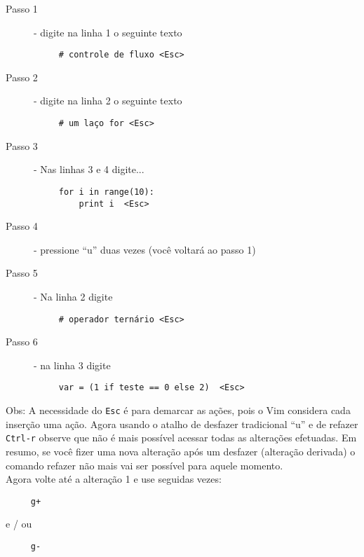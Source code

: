 \begin{description}
\item [Passo 1] - digite na linha 1 o seguinte texto
\begin{verbatim}
     # controle de fluxo <Esc>
\end{verbatim}

\item [Passo 2] - digite na linha 2 o seguinte texto
\begin{verbatim}
     # um laço for <Esc>
\end{verbatim}

\item [Passo 3] - Nas linhas 3 e 4 digite...

\begin{verbatim}
     for i in range(10):
         print i  <Esc>
\end{verbatim}

\item [Passo 4] - pressione ``u'' duas vezes (você voltará ao passo 1)
\item [Passo 5] - Na linha 2 digite

\begin{verbatim}
     # operador ternário <Esc>
\end{verbatim}

\item [Passo 6] - na linha 3 digite

\begin{verbatim}
     var = (1 if teste == 0 else 2)  <Esc>
\end{verbatim}

\end{description}

Obs: A necessidade do {\tt Esc} é para demarcar as ações, pois o Vim
considera cada inserção uma ação.  Agora usando o atalho de desfazer
tradicional ``u'' e de refazer {\tt Ctrl-r} observe que não é mais possível
acessar todas as alterações efetuadas. Em resumo, se você fizer uma
nova alteração após um desfazer (alteração derivada) o comando refazer
não mais vai ser possível para aquele momento. \\

Agora volte até a alteração 1 e use seguidas vezes:

\begin{verbatim}
     g+
\end{verbatim}

e / ou

\begin{verbatim}
     g-
\end{verbatim}

